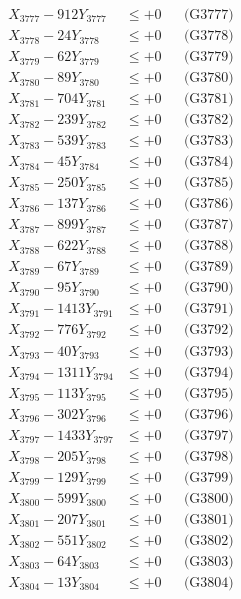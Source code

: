 \documentclass[a4paper,10pt]{article}
\begin{document}
{\begin{align}
X_{3777} - 912Y_{3777} &\leq +0 && \text{(G3777)} \\
X_{3778} - 24Y_{3778} &\leq +0 && \text{(G3778)} \\
X_{3779} - 62Y_{3779} &\leq +0 && \text{(G3779)} \\
X_{3780} - 89Y_{3780} &\leq +0 && \text{(G3780)} \\
\allowbreak
X_{3781} - 704Y_{3781} &\leq +0 && \text{(G3781)} \\
X_{3782} - 239Y_{3782} &\leq +0 && \text{(G3782)} \\
X_{3783} - 539Y_{3783} &\leq +0 && \text{(G3783)} \\
X_{3784} - 45Y_{3784} &\leq +0 && \text{(G3784)} \\
X_{3785} - 250Y_{3785} &\leq +0 && \text{(G3785)} \\
X_{3786} - 137Y_{3786} &\leq +0 && \text{(G3786)} \\
X_{3787} - 899Y_{3787} &\leq +0 && \text{(G3787)} \\
X_{3788} - 622Y_{3788} &\leq +0 && \text{(G3788)} \\
X_{3789} - 67Y_{3789} &\leq +0 && \text{(G3789)} \\
X_{3790} - 95Y_{3790} &\leq +0 && \text{(G3790)} \\
\allowbreak
X_{3791} - 1413Y_{3791} &\leq +0 && \text{(G3791)} \\
X_{3792} - 776Y_{3792} &\leq +0 && \text{(G3792)} \\
X_{3793} - 40Y_{3793} &\leq +0 && \text{(G3793)} \\
X_{3794} - 1311Y_{3794} &\leq +0 && \text{(G3794)} \\
X_{3795} - 113Y_{3795} &\leq +0 && \text{(G3795)} \\
X_{3796} - 302Y_{3796} &\leq +0 && \text{(G3796)} \\
X_{3797} - 1433Y_{3797} &\leq +0 && \text{(G3797)} \\
X_{3798} - 205Y_{3798} &\leq +0 && \text{(G3798)} \\
X_{3799} - 129Y_{3799} &\leq +0 && \text{(G3799)} \\
X_{3800} - 599Y_{3800} &\leq +0 && \text{(G3800)} \\
\allowbreak
X_{3801} - 207Y_{3801} &\leq +0 && \text{(G3801)} \\
X_{3802} - 551Y_{3802} &\leq +0 && \text{(G3802)} \\
X_{3803} - 64Y_{3803} &\leq +0 && \text{(G3803)} \\
X_{3804} - 13Y_{3804} &\leq +0 && \text{(G3804)} \\

\end{align}}
\end{document}
